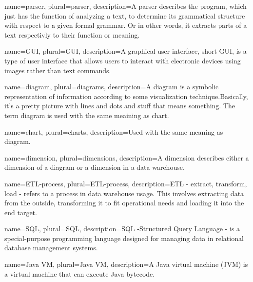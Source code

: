 {
  name=parser,
  plural=parser,
  description={A parser describes the program, which just has the function of analyzing a text, 
  to determine its grammatical structure with respect to a given formal grammar. Or in other words,
  it extracts parts of a text respectivly to their function or meaning. 
  }
}


{
  name=GUI,
  plural=GUI,
  description={A graphical user interface, short GUI, is a type of user interface 
  that allows users to interact with electronic devices using images rather 
  than text commands. %
  }
}


{
  name=diagram,
  plural=diagrams,
  description={A diagram is a symbolic representation of information according to some
  visualization technique.Basically, it's a pretty picture with lines and dots and stuff
  that means something. The term diagram is used with the same meaining as \gls{chart}.
  }
}


{
  name=chart,
  plural=charts,
  description={Used with the same meaning as \gls{diagram}.}
}


{
  name=dimension,
  plural=dimensions,
  description={A dimension describes either a dimension of a \gls{diagram} or a dimension in a
  \gls{data warehouse}.  }
}


{
  name=ETL-process,
  plural=ETL-process,
  description={ETL - extract, transform, load - refers to a process in \gls{data warehouse} usage. This involves
  extracting data from the outside, transforming it to fit operational needs and loading it into the end target.
 }
}


{
  name=SQL,
  plural=SQL,
  description={SQL -Structured Query Language - is a special-purpose programming language designed for 
  managing data in relational \gls{database} management systems. %
  }
}


{
  name=Java VM,
  plural=Java VM,
  description={A Java virtual machine (JVM) is a virtual machine that can execute Java bytecode. 
  }
}



